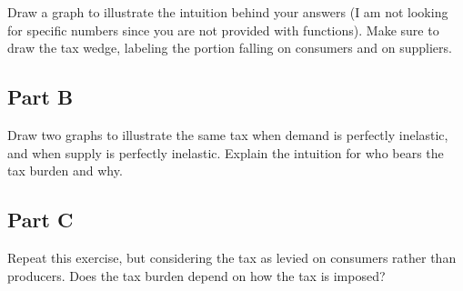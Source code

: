 \documentclass[12pt]{article}
\begin{document}
Draw a graph to illustrate the intuition behind your answers (I am not looking for specific numbers since you are not provided with functions). Make sure to draw the tax wedge, labeling the portion falling on consumers and on suppliers.

\subsection*{Part B}
Draw two graphs to illustrate the same tax when demand is perfectly inelastic, and when supply is perfectly inelastic. Explain the intuition for who bears the tax burden and why.

\subsection*{Part C}

Repeat this exercise, but considering the tax as levied on consumers rather than producers. Does the tax burden depend on how the tax is imposed?
\end{document}
